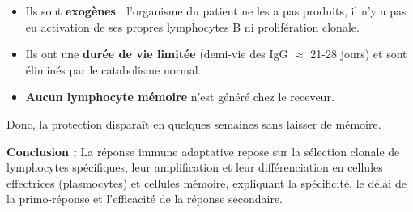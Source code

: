 \documentclass[11pt]{article}
\begin{document}
\begin{exoresolu}
\begin{enumerate}
\begin{itemize}
            \item Ils sont \textbf{exogènes} : l'organisme du patient ne les a pas produits, il n'y a pas eu activation de ses propres lymphocytes B ni prolifération clonale.
            \item Ils ont une \textbf{durée de vie limitée} (demi-vie des IgG $\approx$ 21-28 jours) et sont éliminés par le catabolisme normal.
            \item \textbf{Aucun lymphocyte mémoire} n'est généré chez le receveur.
        \end{itemize}
        Donc, la protection disparaît en quelques semaines sans laisser de mémoire.
    \end{enumerate}
    \textbf{Conclusion :} La réponse immune adaptative repose sur la sélection clonale de lymphocytes spécifiques, leur amplification et leur différenciation en cellules effectrices (plasmocytes) et cellules mémoire, expliquant la spécificité, le délai de la primo-réponse et l'efficacité de la réponse secondaire.
\end{exoresolu}
\end{document}
